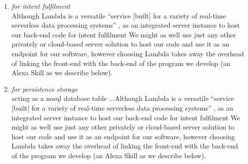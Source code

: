 \begin{enumerate}
%	
	

	\item[\href{https://aws.amazon.com/lambda/}{\textbf{Lambda}} \footnote{\url{https://aws.amazon.com/lambda}}] \textit{for intent fulfilment}\\
	Although Lambda is a versatile ``service [built] for a variety of real-time serverless data processing systems'' \cite{aws_website},  as an integrated server instance to host our back-end code for intent fulfilment%
	We might as well use just any other privately or cloud-based server solution to host our code and use it as an endpoint for our software, however choosing Lambda takes away the overhead of linking the front-end with the back-end of the program we develop (an Alexa Skill as we describe below). 
	
%	
%




\item[\href{https://aws.amazon.com/dynamodb/}{\textbf{DynamoDB}} \footnote{\url{https://aws.amazon.com/dynamodb}}] \textit{for persistence storage}\\
acting as a nosql database table ...Although Lambda is a versatile ``service [built] for a variety of real-time serverless data processing systems'' \cite{aws_website},  as an integrated server instance to host our back-end code for intent fulfilment%
We might as well use just any other privately or cloud-based server solution to host our code and use it as an endpoint for our software, however choosing Lambda takes away the overhead of linking the front-end with the back-end of the program we develop (an Alexa Skill as we describe below). 




\end{enumerate}
